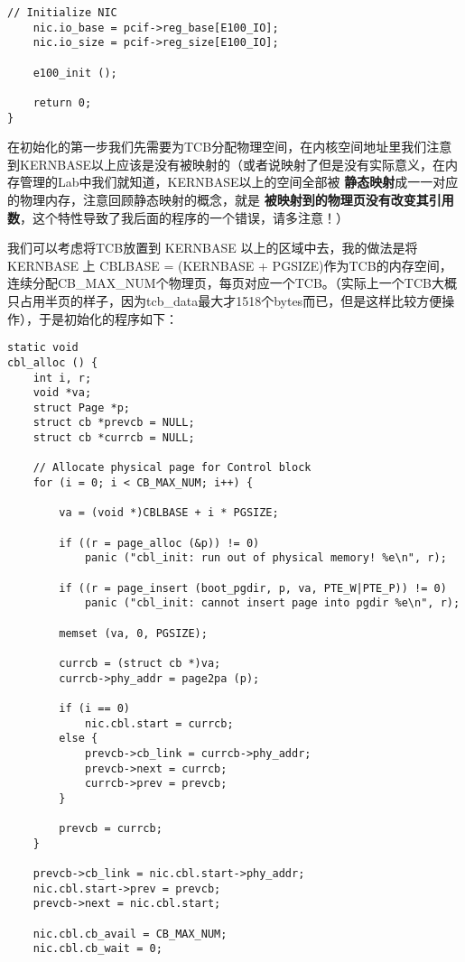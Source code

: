 \documentclass{article}
\newcommand{\highlight}[1]{{\bfseries \color{red}  #1}}
\begin{document}
\begin{CJK*}{UTF8}{gkai}
\begin{lstlisting}[style=ccode, firstnumber=36, title={\scriptsize \ttfamily \bfseries kern/e100.c}]
    // Initialize NIC
    nic.io_base = pcif->reg_base[E100_IO];
    nic.io_size = pcif->reg_size[E100_IO];

    e100_init ();

    return 0;
}
\end{lstlisting}

在初始化的第一步我们先需要为TCB分配物理空间，在内核空间地址里我们注意到KERNBASE以上应该是没有被映射的（或者说映射了但是没有实际意义，在内存管理的Lab中我们就知道，KERNBASE以上的空间全部被\highlight{静态映射}成一一对应的物理内存，注意回顾静态映射的概念，就是\highlight{被映射到的物理页没有改变其引用数}，这个特性导致了我后面的程序的一个错误，请多注意！）

我们可以考虑将TCB放置到 KERNBASE 以上的区域中去，我的做法是将 KERNBASE 上 CBLBASE = (KERNBASE + PGSIZE)作为TCB的内存空间，连续分配CB\_MAX\_NUM个物理页，每页对应一个TCB。（实际上一个TCB大概只占用半页的样子，因为tcb\_data最大才1518个bytes而已，但是这样比较方便操作），于是初始化的程序如下：


\begin{lstlisting}[style=ccode, title={\scriptsize \ttfamily \bfseries kern/e100.c: cbl\_alloc()}]
static void
cbl_alloc () {
    int i, r;
    void *va;
    struct Page *p;
    struct cb *prevcb = NULL;
    struct cb *currcb = NULL;

    // Allocate physical page for Control block
    for (i = 0; i < CB_MAX_NUM; i++) {

        va = (void *)CBLBASE + i * PGSIZE;

        if ((r = page_alloc (&p)) != 0)
            panic ("cbl_init: run out of physical memory! %e\n", r);

        if ((r = page_insert (boot_pgdir, p, va, PTE_W|PTE_P)) != 0)
            panic ("cbl_init: cannot insert page into pgdir %e\n", r);

        memset (va, 0, PGSIZE);

        currcb = (struct cb *)va;
        currcb->phy_addr = page2pa (p);

        if (i == 0)
            nic.cbl.start = currcb;
        else {
            prevcb->cb_link = currcb->phy_addr;
            prevcb->next = currcb;
            currcb->prev = prevcb;
        }

        prevcb = currcb;
    }

    prevcb->cb_link = nic.cbl.start->phy_addr;
    nic.cbl.start->prev = prevcb;
    prevcb->next = nic.cbl.start;

    nic.cbl.cb_avail = CB_MAX_NUM;
    nic.cbl.cb_wait = 0;


\end{lstlisting}
\end{CJK*}
\end{document}
